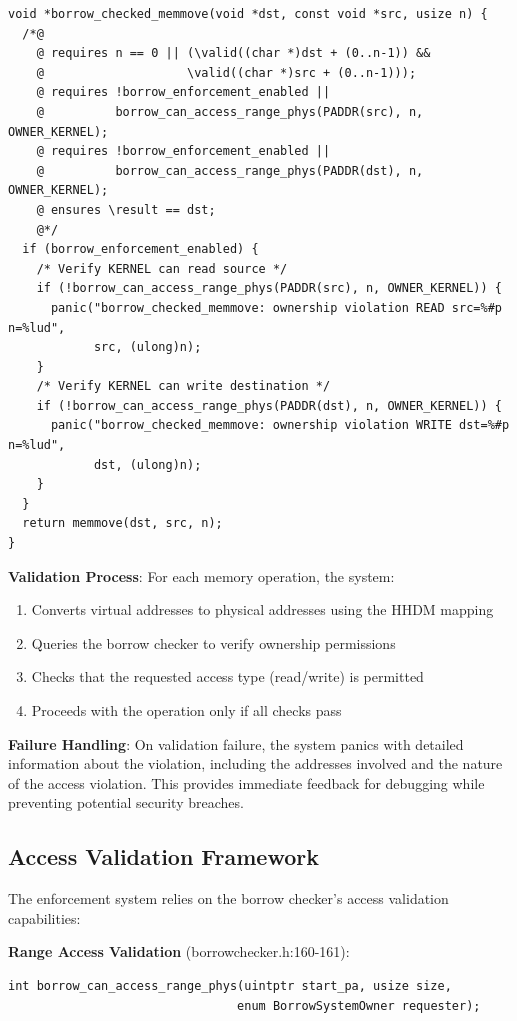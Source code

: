 \documentclass[11pt,letterpaper]{article}
\begin{document}
\begin{lstlisting}
void *borrow_checked_memmove(void *dst, const void *src, usize n) {
  /*@
    @ requires n == 0 || (\valid((char *)dst + (0..n-1)) &&
    @                    \valid((char *)src + (0..n-1)));
    @ requires !borrow_enforcement_enabled ||
    @          borrow_can_access_range_phys(PADDR(src), n, OWNER_KERNEL);
    @ requires !borrow_enforcement_enabled ||
    @          borrow_can_access_range_phys(PADDR(dst), n, OWNER_KERNEL);
    @ ensures \result == dst;
    @*/
  if (borrow_enforcement_enabled) {
    /* Verify KERNEL can read source */
    if (!borrow_can_access_range_phys(PADDR(src), n, OWNER_KERNEL)) {
      panic("borrow_checked_memmove: ownership violation READ src=%#p n=%lud",
            src, (ulong)n);
    }
    /* Verify KERNEL can write destination */
    if (!borrow_can_access_range_phys(PADDR(dst), n, OWNER_KERNEL)) {
      panic("borrow_checked_memmove: ownership violation WRITE dst=%#p n=%lud",
            dst, (ulong)n);
    }
  }
  return memmove(dst, src, n);
}
\end{lstlisting}

\textbf{Validation Process}: For each memory operation, the system:
\begin{enumerate}
\item Converts virtual addresses to physical addresses using the HHDM mapping
\item Queries the borrow checker to verify ownership permissions
\item Checks that the requested access type (read/write) is permitted
\item Proceeds with the operation only if all checks pass
\end{enumerate}

\textbf{Failure Handling}: On validation failure, the system panics with detailed information about the violation, including the addresses involved and the nature of the access violation. This provides immediate feedback for debugging while preventing potential security breaches.

\subsection{Access Validation Framework}

The enforcement system relies on the borrow checker's access validation capabilities:

\textbf{Range Access Validation} (borrowchecker.h:160-161):

\begin{lstlisting}
int borrow_can_access_range_phys(uintptr start_pa, usize size,
                                enum BorrowSystemOwner requester);
\end{lstlisting}
\end{document}
